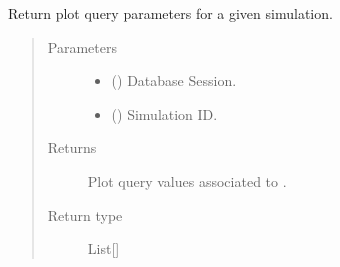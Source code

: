 \documentclass[a4paper,landscape,10pt,english]{sphinxmanual}
\begin{document}

\begin{fulllineitems}
\label{\detokenize{code_docs/simulation_api.model:simulation_api.model.crud._get_plot_query_values}}
Return plot query parameters for a given simulation.
\begin{quote}\begin{description}
\item[{Parameters}] \leavevmode\begin{itemize}
\item {} 
 () \textendash{} Database Session.

\item {} 
 () \textendash{} Simulation ID.

\end{itemize}

\item[{Returns}] \leavevmode
Plot query values associated to .

\item[{Return type}] \leavevmode
List{[}{\hyperref[\detokenize{code_docs/simulation_api.controller:simulation_api.controller.schemas.PlotQueryValues}]{}}{]}

\end{description}\end{quote}

\end{fulllineitems}

\end{document}

